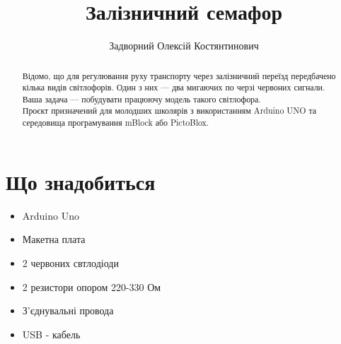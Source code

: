 \documentclass[oneside, final]{article}
\title{\bf Залізничний семафор}
\author{Задворний Олексій Костянтинович}
\begin{document}
\maketitle

\begin{abstract}
\noindent Відомо, що для регулювання руху транспорту через залізничний переїзд передбачено кілька видів світлофорів.
Один з них — два мигаючих по черзі червоних сигнали.\\
Ваша задача — побудувати працюючу модель такого світлофора.\\

\noindent Проєкт призначений для молодших школярів з використанням Arduino UNO та середовища програмування mBlock або PictoBlox.
\end{abstract}

\section{Що знадобиться}
	\begin{itemize}
		\item Arduino Uno
		\item Макетна плата
		\item 2 червоних свтлодіоди
		\item 2 резистори опором 220-330 Ом
		\item З’єднувальні провода
		\item USB - кабель
	\end{itemize}
\end{document}
